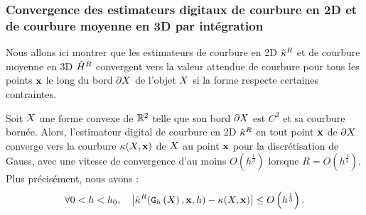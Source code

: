 \subsubsection{Convergence des estimateurs digitaux de courbure en 2D et de courbure moyenne en 3D par intégration}
%
Nous allons ici montrer que les estimateurs de courbure en 2D $\hat{\kappa}^{R}$ et de
courbure moyenne en 3D $\hat{H}^{R}$ convergent vers la valeur attendue de
courbure pour tous les points $\mathbf{x}$ le long du bord $\partial X$ de l'objet $X$ si
la forme respecte certaines contraintes.
%
\begin{theorem}{}
  \label{thm:convergence-curv-2d}
  Soit $X$ une forme convexe de $\mathbb{R}^2$ telle que son bord $\partial X$ est $C^2$ et
  sa courbure bornée. Alors, l'estimateur digital de courbure en 2D $\hat{\kappa}^{R}$ en
  tout point $\mathbf{x}$ de $\partial X$ converge vers la courbure
  $\kappa(X,\mathbf{x})$ de $X$ au point $\mathbf{x}$ pour la discrétisation de
  Gauss, avec une vitesse de convergence d'au moins $O(h^{\frac{1}{3}})$ lorsque
  $R = O(h^{\frac{1}{3}})$. Plus précisément, nous avons :
  \begin{equation}
    \forall 0 < h < h_0,
    \quad \left | \CurvH{R}(\DSh, \vx, h) - \Curv(\Shape, \vx) \right|
                          \le O \left(h^{\frac{1}{3}}\right). %
  \end{equation}
\end{theorem}
